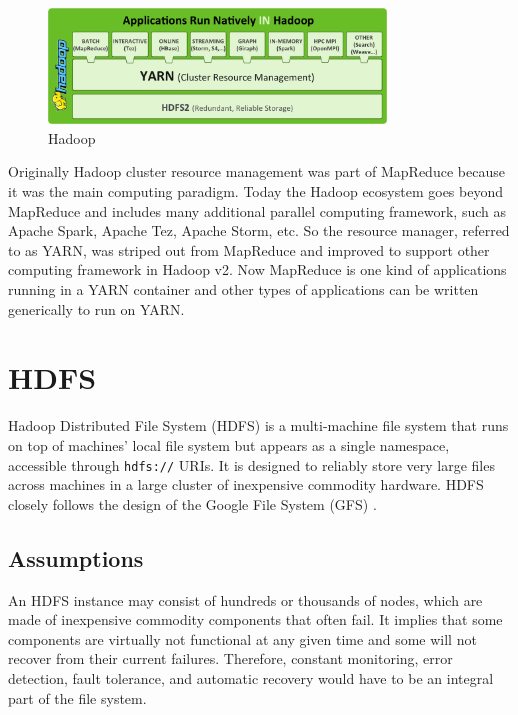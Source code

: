 \documentclass[11pt]{book}
\begin{document}
\begin{figure}[t]
\includegraphics[width=0.8\textwidth]{images/hadoop.png}
\centering
\caption{Hadoop}
\end{figure}

Originally Hadoop cluster resource management was part of MapReduce because it was the main computing paradigm. Today the Hadoop ecosystem goes beyond MapReduce and includes many additional parallel computing framework, such as Apache Spark, Apache Tez, Apache Storm, etc. So the resource manager, referred to as YARN, was striped out from MapReduce and improved to support other computing framework in Hadoop v2. Now MapReduce is one kind of applications running in a YARN container and other types of applications can be written generically to run on YARN.

\section[HDFS]
{HDFS}
Hadoop Distributed File System (HDFS) \cite{HDFS} is a multi-machine file system that runs on top of machines' local file system but appears as a single namespace, accessible through \texttt{hdfs://} URIs. It is designed to reliably store very large files across machines in a large cluster of inexpensive commodity hardware. HDFS closely follows the design of the Google File System (GFS) \cite{Ghemawat:2003:GFS, McKusick:2009:GEF}.

\subsection{Assumptions}
An HDFS instance may consist of hundreds or thousands of nodes, which are made of inexpensive commodity components that often fail. It implies that some components are virtually not functional at any given time and some will not recover from their current failures. Therefore, constant monitoring, error detection, fault tolerance, and automatic recovery would have to be an integral part of the file system.
\end{document}
